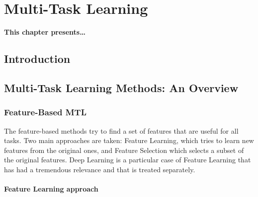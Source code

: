 
\chapter{Multi-Task Learning} %
\label{Chapter2}

{\bf \small{
This chapter presents\dots
}}

\section{Introduction}






\section{Multi-Task Learning Methods: An Overview}\label{sec:ch3_overview}

\subsection{Feature-Based MTL}
The feature-based methods try to find a set of features that are useful for all tasks. Two main approaches are taken: Feature Learning, which tries to learn new features from the original ones, and Feature Selection which selects a subset of the original features.
Deep Learning is a particular case of Feature Learning that has had a tremendous relevance and that is treated separately. 

\subsubsection*{Feature Learning approach}


